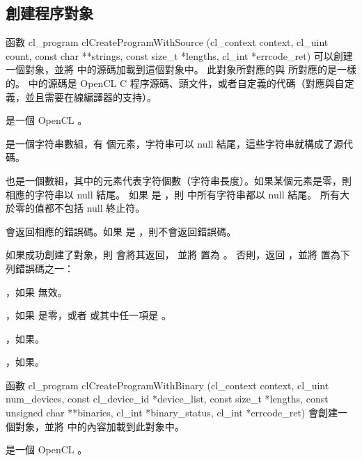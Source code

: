 \subsection{創建程序對象}

函數
\startclc
cl_program clCreateProgramWithSource (cl_context context,
			cl_uint count,
			const char **strings,
			const size_t *lengths,
			cl_int *errcode_ret)
\stopclc
可以創建一個對象，並將  中的源碼加載到這個對象中。
此對象所對應的與  所對應的是一樣的。
  中的源碼是 OpenCL C 程序源碼、頭文件，或者自定義的代碼（對應與自定義，並且需要在線編譯器的支持）。

 是一個 OpenCL 。

 是一個字符串數組，有  個元素，字符串可以 null 結尾，這些字符串就構成了源代碼。

 也是一個數組，其中的元素代表字符個數（字符串長度）。如果某個元素是零，則相應的字符串以 null 結尾。
如果  是 ，則  中所有字符串都以 null 結尾。
所有大於零的值都不包括 null 終止符。

 會返回相應的錯誤碼。如果  是 ，則不會返回錯誤碼。

如果成功創建了對象，則  會將其返回，
並將  置為 。
否則，返回 ，並將  置為下列錯誤碼之一：
\startigBase
\item {}，如果  無效。

\item {}，如果  是零，或者  或其中任一項是 。

\item {}，如果\scdevfailres。

\item {}，如果\schostfailres。
\stopigBase

函數
\startclc
cl_program clCreateProgramWithBinary (cl_context context,
			cl_uint num_devices,
			const cl_device_id *device_list,
			const size_t *lengths,
			const unsigned char **binaries,
			cl_int *binary_status,
			cl_int *errcode_ret)
\stopclc
會創建一個對象，並將  中的內容加載到此對象中。

 是一個 OpenCL 。

